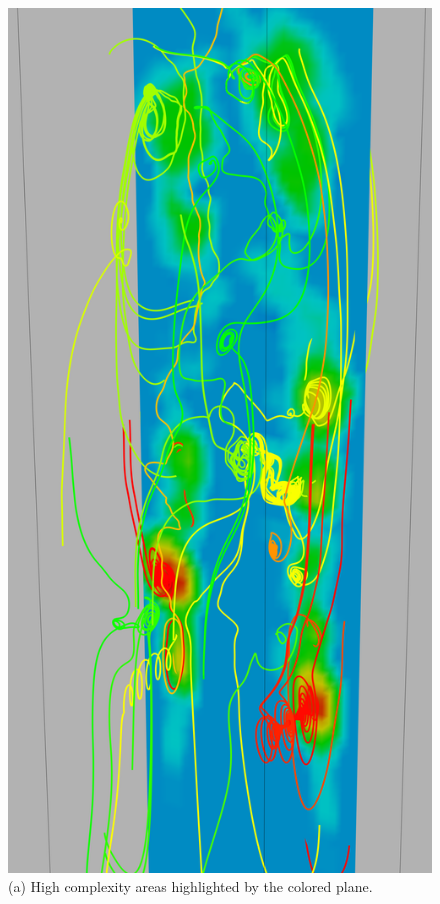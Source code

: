 \documentclass[journal]{vgtc}                %
\begin{document}
\begin{figure}[t]
	\centering
		\begin{minipage}{0.47\linewidth}
			\centering \small
			\includegraphics[height = 2\linewidth]{Images/plume_plane_crop.png}\\(a) High complexity areas highlighted by the colored plane. \vspace{0.2em}

\end{minipage}
\end{figure}
\end{document}
